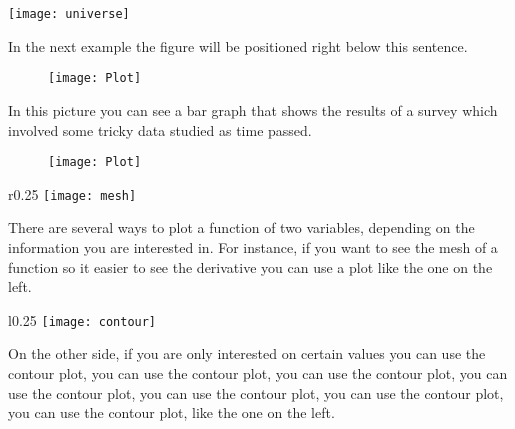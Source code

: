 \documentclass{article}
\begin{document}
\texttt{[image: universe]}

\vspace{1.5cm}

In the next example the figure will be positioned right below this sentence.

\begin{figure}[h]
\texttt{[image: Plot]}
\end{figure}

\newpage

In this picture you can see a bar graph that shows
the results of a survey which involved some tricky
data studied as time passed.

\begin{figure}[t]
\centering
\texttt{[image: Plot]}
\end{figure}

\newpage


\begin{wrapfigure}{r}{0.25\textwidth} %
    \centering
    \texttt{[image: mesh]}
\end{wrapfigure}

\vspace{1.2cm}

There are several ways to plot a function of two variables, depending on the information you are interested in. For instance, if you want to see the mesh of a function so it easier to see the derivative you can use a plot like the one on the left.


\begin{wrapfigure}{l}{0.25\textwidth} %
    \centering
    \texttt{[image: contour]}
\end{wrapfigure}

On the other side, if you are only interested on certain values you can use the contour plot, you can use the contour plot, you can use the contour plot, you can use the contour plot, you can use the contour plot, you can use the contour plot, you can use the contour plot, like the one on the left.
\end{document}

